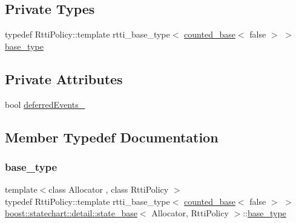 \subsection*{Private Types}
\begin{DoxyCompactItemize}
\item 
typedef Rtti\+Policy\+::template rtti\+\_\+base\+\_\+type$<$ \mbox{\hyperlink{classboost_1_1statechart_1_1detail_1_1counted__base}{counted\+\_\+base}}$<$ false $>$ $>$ \mbox{\hyperlink{classboost_1_1statechart_1_1detail_1_1state__base_a62fb2a82dc97412bdbd6adc1a19ed6ac}{base\+\_\+type}}
\end{DoxyCompactItemize}
\subsection*{Private Attributes}
\begin{DoxyCompactItemize}
\item 
bool \mbox{\hyperlink{classboost_1_1statechart_1_1detail_1_1state__base_af5db61d410c3ee39052fbad78c3d9d6e}{deferred\+Events\+\_\+}}
\end{DoxyCompactItemize}


\subsection{Member Typedef Documentation}
\mbox{\label{classboost_1_1statechart_1_1detail_1_1state__base_a62fb2a82dc97412bdbd6adc1a19ed6ac}} 
\subsubsection{\texorpdfstring{base\+\_\+type}{base\_type}}
{\footnotesize\ttfamily template$<$class Allocator , class Rtti\+Policy $>$ \\
typedef Rtti\+Policy\+::template rtti\+\_\+base\+\_\+type$<$ \mbox{\hyperlink{classboost_1_1statechart_1_1detail_1_1counted__base}{counted\+\_\+base}}$<$ false $>$ $>$ \mbox{\hyperlink{classboost_1_1statechart_1_1detail_1_1state__base}{boost\+::statechart\+::detail\+::state\+\_\+base}}$<$ Allocator, Rtti\+Policy $>$\+::\mbox{\hyperlink{classboost_1_1statechart_1_1detail_1_1state__base_a62fb2a82dc97412bdbd6adc1a19ed6ac}{base\+\_\+type}}\hspace{0.3cm}{\ttfamily [private]}}

